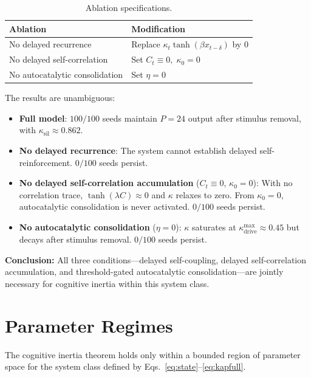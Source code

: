 \begin{table}[h]
\centering
\caption{Ablation specifications.}
\label{tab:ablation}
\begin{tabular}{ll}
\toprule
Ablation & Modification \\
\midrule
No delayed recurrence & Replace $\kappa_t\tanh(\beta x_{t-\delta})$ by $0$ \\
No delayed self-correlation & Set $C_t \equiv 0,\; \kappa_0 = 0$ \\
No autocatalytic consolidation & Set $\eta = 0$ \\
\bottomrule
\end{tabular}
\end{table}

The results are unambiguous:
\begin{itemize}
    \item \textbf{Full model}: $100/100$ seeds maintain $P=24$ output after stimulus removal, with $\kappa_{\mathrm{sil}} \approx 0.862$.
    \item \textbf{No delayed recurrence}: The system cannot establish delayed self-reinforcement. $0/100$ seeds persist.
    \item \textbf{No delayed self-correlation accumulation} ($C_t \equiv 0$, $\kappa_0 = 0$): With no correlation trace, $\tanh(\lambda C) \approx 0$ and $\kappa$ relaxes to zero. From $\kappa_0 = 0$, autocatalytic consolidation is never activated. $0/100$ seeds persist.
    \item \textbf{No autocatalytic consolidation} ($\eta = 0$): $\kappa$ saturates at $\kappa_{\mathrm{drive}}^{\max} \approx 0.45$ but decays after stimulus removal. $0/100$ seeds persist.
\end{itemize}

\textbf{Conclusion:} All three conditions---delayed self-coupling, delayed self-correlation accumulation, and threshold-gated autocatalytic consolidation---are jointly necessary for cognitive inertia within this system class.

\section{Parameter Regimes}

The cognitive inertia theorem holds only within a bounded region of parameter space for the system class defined by Eqs.~\eqref{eq:state}--\eqref{eq:kapfull}.


